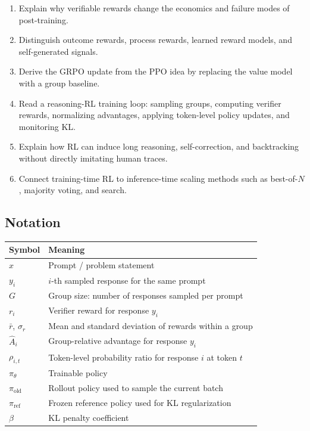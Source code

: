 \begin{enumerate}
  \item Explain why verifiable rewards change the economics and failure modes of post-training.
  \item Distinguish outcome rewards, process rewards, learned reward models, and self-generated signals.
  \item Derive the GRPO update from the PPO idea by replacing the value model with a group baseline.
  \item Read a reasoning-RL training loop: sampling groups, computing verifier rewards, normalizing advantages, applying token-level policy updates, and monitoring KL.
  \item Explain how RL can induce long reasoning, self-correction, and backtracking without directly imitating human traces.
  \item Connect training-time RL to inference-time scaling methods such as best-of-$N$, majority voting, and search.
\end{enumerate}

\subsection*{Notation}

\begin{center}
\begin{tabular}{ll}
\toprule
Symbol & Meaning \\
\midrule
$x$ & Prompt / problem statement \\
$y_i$ & $i$-th sampled response for the same prompt \\
$G$ & Group size: number of responses sampled per prompt \\
$r_i$ & Verifier reward for response $y_i$ \\
$\bar{r}$, $\sigma_r$ & Mean and standard deviation of rewards within a group \\
$\hat{A}_i$ & Group-relative advantage for response $y_i$ \\
$\rho_{i,t}$ & Token-level probability ratio for response $i$ at token $t$ \\
$\pi_\theta$ & Trainable policy \\
$\pi_{\text{old}}$ & Rollout policy used to sample the current batch \\
$\pi_{\text{ref}}$ & Frozen reference policy used for KL regularization \\
$\beta$ & KL penalty coefficient \\
\bottomrule
\end{tabular}
\end{center}

